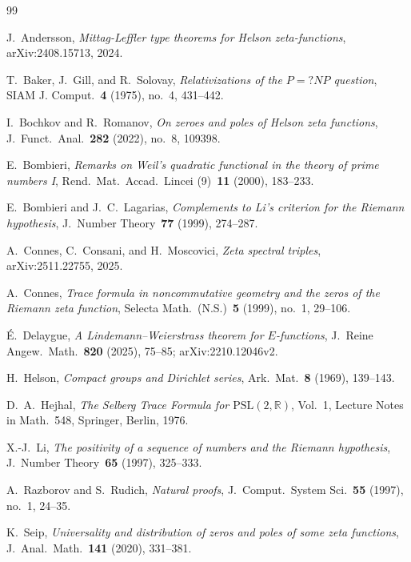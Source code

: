 \documentclass[12pt]{amsart}
\theoremstyle{definition}
\theoremstyle{remark}
\theoremstyle{plain}
\begin{document}
{\sloppy
\begin{thebibliography}{99}

J.~Andersson,
\emph{Mittag-Leffler type theorems for Helson zeta-functions},
arXiv:2408.15713, 2024.

T.~Baker, J.~Gill, and R.~Solovay,
\emph{Relativizations of the $P=?NP$ question},
SIAM J. Comput.~\textbf{4} (1975), no.~4, 431--442.

I.~Bochkov and R.~Romanov,
\emph{On zeroes and poles of Helson zeta functions},
J.\ Funct.\ Anal.~\textbf{282} (2022), no.~8, 109398.

E.~Bombieri,
\emph{Remarks on Weil's quadratic functional in the theory of prime
numbers I},
Rend.\ Mat.\ Accad.\ Lincei (9)~\textbf{11} (2000), 183--233.

E.~Bombieri and J.~C.~Lagarias,
\emph{Complements to Li's criterion for the Riemann hypothesis},
J.\ Number Theory~\textbf{77} (1999), 274--287.

A.~Connes, C.~Consani, and H.~Moscovici,
\emph{Zeta spectral triples},
arXiv:2511.22755, 2025.

A.~Connes,
\emph{Trace formula in noncommutative geometry and the zeros of the
Riemann zeta function},
Selecta Math.\ (N.S.)~\textbf{5} (1999), no.~1, 29--106.

\'E.~Delaygue,
\emph{A Lindemann--Weierstrass theorem for $E$-functions},
J.\ Reine Angew.\ Math.\ \textbf{820} (2025), 75--85;
arXiv:2210.12046v2.

H.~Helson,
\emph{Compact groups and Dirichlet series},
Ark.\ Mat.~\textbf{8} (1969), 139--143.

D.~A.~Hejhal,
\emph{The Selberg Trace Formula for $\mathrm{PSL}(2,\mathbb{R})$},
Vol.~1, Lecture Notes in Math.~548, Springer, Berlin, 1976.

X.-J.~Li,
\emph{The positivity of a sequence of numbers and the Riemann hypothesis},
J.\ Number Theory~\textbf{65} (1997), 325--333.

A.~Razborov and S.~Rudich,
\emph{Natural proofs},
J.\ Comput.\ System Sci.~\textbf{55} (1997), no.~1, 24--35.

K.~Seip,
\emph{Universality and distribution of zeros and poles of some zeta
functions},
J.\ Anal.\ Math.~\textbf{141} (2020), 331--381.

\end{thebibliography}
}
\end{document}
